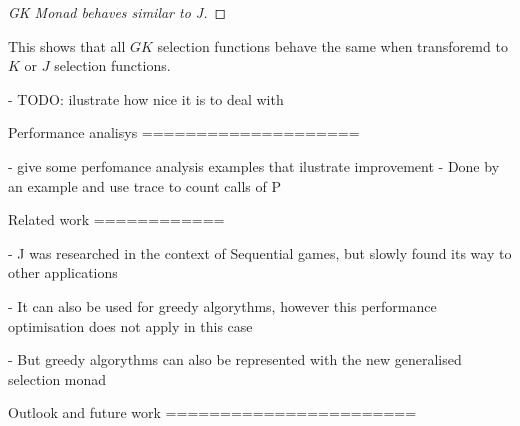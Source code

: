 \begin{proof}[GK Monad behaves similar to J]
\resethooks
\end{proof}

This shows that all $GK$ selection functions behave the same when transforemd to $K$ or 
$J$ selection functions.

- TODO: ilustrate how nice it is to deal with

Performance analisys
====================

-  give some perfomance analysis examples that ilustrate improvement
-  Done by an example and use trace to count calls of P

Related work
============

- J was researched in the context of Sequential games, but slowly found its way to other 
applications

- It can also be used for greedy algorythms, however this performance optimisation
does not apply in this case

- But greedy algorythms can also be represented with the new generalised selection monad

Outlook and future work
=======================

